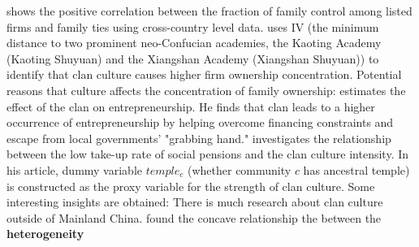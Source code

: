 \documentclass[10pt]{report}
\begin{document}
\cite{bertrand2006role} shows the positive correlation between the fraction of family control among listed firms and family
ties using cross-country level data.
\cite{cheng2021clan} uses IV (the minimum distance to two prominent neo-Confucian academies,
the Kaoting Academy (Kaoting Shuyuan) and the Xiangshan Academy (Xiangshan Shuyuan)) to identify that
clan culture causes higher firm ownership concentration.
Potential reasons that culture affects the concentration of family ownership:
\cite{zhang2020clans} estimates the effect of the clan on entrepreneurship. He finds that clan leads to a higher
occurrence of entrepreneurship by helping overcome financing constraints and escape from local governments' "grabbing hand."
\cite{zhang2019family} investigates the relationship between the low take-up rate of social pensions and the clan culture intensity. In
his article, dummy variable $temple_c$ (whether community $c$ has ancestral temple) is constructed as the proxy variable for the strength of clan culture. Some interesting insights are obtained:
\cite{cao2022clans}
There is much research about clan culture outside of Mainland China. \cite{yang2019family} found the concave relationship the between the \textbf{heterogeneity}
\end{document}
